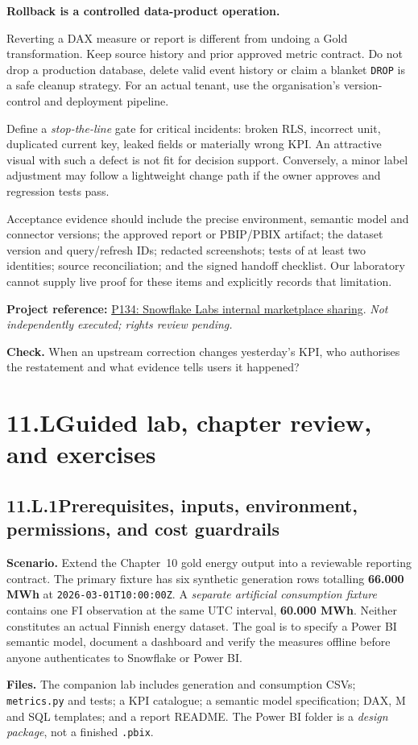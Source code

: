 \documentclass[11pt,twoside]{article}
\newcommand{\topic}[2]{\subsection*{#1\quad #2}}
\newcommand{\repo}[2]{\par\begingroup\fontsize{8.0}{9.6}\selectfont\sffamily\color{inkgray}\textbf{Project reference:} \href{#2}{#1}. \textit{Not independently executed; rights review pending.}\par\endgroup}
\begin{document}
\begin{insight}\textbf{Rollback is a controlled data-product operation.}\par
Reverting a DAX measure or report is different from undoing a Gold transformation. Keep source history and prior approved metric contract. Do not drop a production database, delete valid event history or claim a blanket \texttt{DROP} is a safe cleanup strategy. For an actual tenant, use the organisation's version-control and deployment pipeline.\end{insight}
Define a \emph{stop-the-line} gate for critical incidents: broken RLS, incorrect unit, duplicated current key, leaked fields or materially wrong KPI. An attractive visual with such a defect is not fit for decision support. Conversely, a minor label adjustment may follow a lightweight change path if the owner approves and regression tests pass.

Acceptance evidence should include the precise environment, semantic model and connector versions; the approved report or PBIP/PBIX artifact; the dataset version and query/refresh IDs; redacted screenshots; tests of at least two identities; source reconciliation; and the signed handoff checklist. Our laboratory cannot supply live proof for these items and explicitly records that limitation.
\repo{P134: Snowflake Labs internal marketplace sharing}{https://github.com/Snowflake-Labs/sfguide-intra-company-data-sharing-with-the-snowflake-internal-marketplace}
\textbf{Check.} When an upstream correction changes yesterday's KPI, who authorises the restatement and what evidence tells users it happened?
\newpage
\section*{11.L\quad Guided lab, chapter review, and exercises}
\topic{11.L.1}{Prerequisites, inputs, environment, permissions, and cost guardrails}
\textbf{Scenario.} Extend the Chapter~10 gold energy output into a reviewable reporting contract. The primary fixture has six synthetic generation rows totalling \textbf{66.000 MWh} at \texttt{2026-03-01T10:00:00Z}. A \emph{separate artificial consumption fixture} contains one FI observation at the same UTC interval, \textbf{60.000 MWh}. Neither constitutes an actual Finnish energy dataset. The goal is to specify a Power BI semantic model, document a dashboard and verify the measures offline before anyone authenticates to Snowflake or Power BI.

\textbf{Files.} The companion lab includes generation and consumption CSVs; \texttt{metrics.py} and tests; a KPI catalogue; a semantic model specification; DAX, M and SQL templates; and a report README. The Power BI folder is a \emph{design package}, not a finished \texttt{.pbix}.
\end{document}
